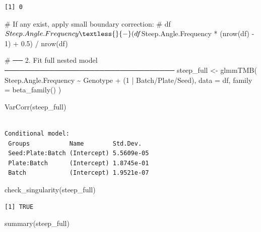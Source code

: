 \documentclass[
  letterpaper,
  DIV=11,
  numbers=noendperiod]{scrartcl}
\newenvironment{Shaded}{\begin{snugshade}}{\end{snugshade}}
\newcommand{\AttributeTok}[1]{\textcolor[rgb]{0.40,0.45,0.13}{#1}}
\newcommand{\CommentTok}[1]{\textcolor[rgb]{0.37,0.37,0.37}{#1}}
\newcommand{\DecValTok}[1]{\textcolor[rgb]{0.68,0.00,0.00}{#1}}
\newcommand{\FunctionTok}[1]{\textcolor[rgb]{0.28,0.35,0.67}{#1}}
\newcommand{\NormalTok}[1]{\textcolor[rgb]{0.00,0.23,0.31}{#1}}
\newcommand{\OtherTok}[1]{\textcolor[rgb]{0.00,0.23,0.31}{#1}}
\newcommand{\SpecialCharTok}[1]{\textcolor[rgb]{0.37,0.37,0.37}{#1}}
\begin{document}
\begin{verbatim}
[1] 0
\end{verbatim}

\begin{Shaded}
\begin{Highlighting}[]
\CommentTok{\# If any exist, apply small boundary correction:}
\CommentTok{\# df$Steep.Angle.Frequency \textless{}{-} (df$Steep.Angle.Frequency * (nrow(df) {-} 1) + 0.5) / nrow(df)}


\CommentTok{\# ── 2. Fit full nested model ──────────────────────────────────}
\NormalTok{steep\_full }\OtherTok{\textless{}{-}} \FunctionTok{glmmTMB}\NormalTok{(}
\NormalTok{  Steep.Angle.Frequency }\SpecialCharTok{\textasciitilde{}}\NormalTok{ Genotype }\SpecialCharTok{+}\NormalTok{ (}\DecValTok{1} \SpecialCharTok{|}\NormalTok{ Batch}\SpecialCharTok{/}\NormalTok{Plate}\SpecialCharTok{/}\NormalTok{Seed),}
  \AttributeTok{data =}\NormalTok{ df, }\AttributeTok{family =} \FunctionTok{beta\_family}\NormalTok{()}
\NormalTok{)}

\FunctionTok{VarCorr}\NormalTok{(steep\_full)}
\end{Highlighting}
\end{Shaded}

\begin{verbatim}

Conditional model:
 Groups           Name        Std.Dev.  
 Seed:Plate:Batch (Intercept) 5.5609e-05
 Plate:Batch      (Intercept) 1.8745e-01
 Batch            (Intercept) 1.9521e-07
\end{verbatim}

\begin{Shaded}
\begin{Highlighting}[]
\FunctionTok{check\_singularity}\NormalTok{(steep\_full)}
\end{Highlighting}
\end{Shaded}

\begin{verbatim}
[1] TRUE
\end{verbatim}

\begin{Shaded}
\begin{Highlighting}[]
\FunctionTok{summary}\NormalTok{(steep\_full)}
\end{Highlighting}
\end{Shaded}
\end{document}
